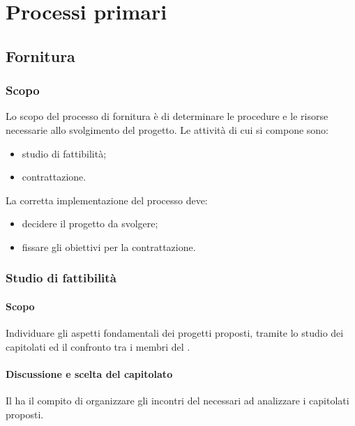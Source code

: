 \section{Processi primari}
    \subsection{Fornitura}
        \subsubsection{Scopo}
        Lo scopo del processo di fornitura è di determinare le procedure e le risorse necessarie allo svolgimento del progetto. Le attività di cui si compone sono:
        \begin{itemize}
            \item studio di fattibilità;
            \item contrattazione.
        \end{itemize}
        La corretta implementazione del processo deve:
        \begin{itemize}
            \item decidere il progetto da svolgere;
            \item fissare gli obiettivi per la contrattazione.
        \end{itemize}

        \subsubsection{Studio di fattibilità}
            \paragraph{Scopo}
            Individuare gli aspetti fondamentali dei progetti proposti, tramite lo studio dei capitolati ed il confronto tra i membri del .
            \paragraph{Discussione e scelta del capitolato}
            Il \responsabilediprogetto{} ha il compito di organizzare gli incontri del  necessari ad analizzare i capitolati proposti.
